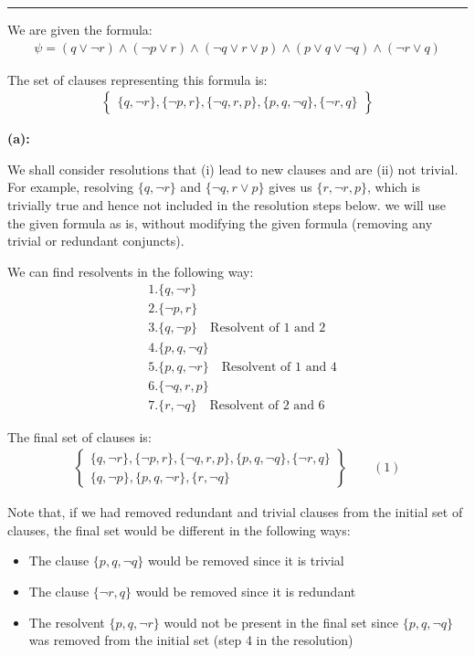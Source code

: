 \documentclass[12pt,letterpaper, onecolumn]{exam}
\begin{document}
\begin{questions}
    {\rule{17cm}{0.4pt}}
	\question[]
	\solutiontitle

	We are given the formula:
	\begin{align*}
		\psi = (q \lor \neg r) \land (\neg p \lor r) \land (\neg q \lor r \lor p) \land (p \lor q \lor \neg q) \land (\neg r \lor q)
	\end{align*}

	The set of clauses representing this formula is:
	\begin{align*}
		\left .
			\begin{cases}
				\{q, \neg r\}, \{\neg p, r\}, \{\neg q, r, p\}, \{p, q, \neg q\}, \{\neg r, q\}
			\end{cases}
		\right\}
	\end{align*}

	\textbf{(a):}

	We shall consider resolutions that (i) lead to new clauses and are (ii) not trivial. 
	For example, resolving $\{q, \neg r \}$ and $\{ \neg q, r \lor p \}$ gives us $\{ r, \neg r, p \}$, which is trivially true and hence not included
	in the resolution steps below. we will use the given formula as is, without modifying the given formula (removing any trivial or redundant conjuncts).  
	
	We can find resolvents in the following way:
	\begin{align*}
		& 1. \{ q, \neg r \} \\
		& 2. \{ \neg p, r \} \\
		& 3. \{ q, \neg p \} \quad \text{Resolvent of 1 and 2} \\
		& 4. \{ p, q, \neg q \} \\
		& 5. \{ p, q, \neg r \} \quad \text{Resolvent of 1 and 4} \\
		& 6. \{ \neg q, r, p \} \\
		& 7. \{ r, \neg q \} \quad \text{Resolvent of 2 and 6}
	\end{align*}

	The final set of clauses is:
	\begin{align*}
		\left .
			\begin{cases}
				\{q, \neg r\}, \{\neg p, r\}, \{\neg q, r, p\}, \{p, q, \neg q\}, \{\neg r, q\} \\
				\{ q, \neg p \}, \{ p, q, \neg r \}, \{ r, \neg q \}
			\end{cases}
		\right\} \quad \quad {(1)\label{set1}}
	\end{align*}

	Note that, if we had removed redundant and trivial clauses from the initial set of clauses, the final set would be different in the following ways:
	\begin{itemize}
		\item The clause $\{ p, q, \neg q \} $ would be removed since it is trivial
		\item The clause $\{ \neg r, q \}$ would be removed since it is redundant
		\item The resolvent $ \{ p, q, \neg r \} $ would not be present in the final set since $\{ p, q, \neg q \} $ was removed from the initial set (step 4 in the resolution)
	\end{itemize}


\end{questions}
\end{document}
